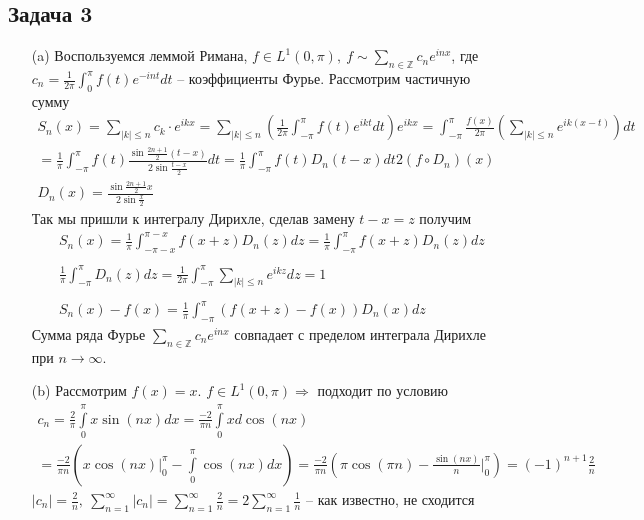 \subsection*{Задача 3}
\begin{enumerate}
\item[(a)]
	Воспользуемся леммой Римана, $f \in L^1(0,\pi),\ f \sim \sum\limits_{n \in \mathbb{Z}} c_n e^{inx}$, где $c_n = \frac{1}{2\pi} \int_{0}^{\pi} f(t) e^{-int} dt$ -- коэффициенты Фурье. Рассмотрим частичную сумму 
	\begin{gather*}
	S_n(x)
	= \sum\limits_{|k| \leqslant n} c_k \cdot e^{ikx}
	= \sum\limits_{|k| \leqslant n} \left(\frac{1}{2\pi} \int_{-\pi}^{\pi} f(t) e^{ikt} dt\right) e^{ikx}
	= \int_{-\pi}^{\pi} \frac{f(x)}{2\pi} \left(\sum\limits_{|k| \leqslant n} e^{ik(x-t)}\right)dt\\
	= \frac{1}{\pi} \int_{-\pi}^{\pi} f(t) \frac{\sin \frac{2n+1}{2}(t-x)}{2\sin \frac{t-x}{2}} dt
	= \frac{1}{\pi} \int_{-\pi}^{\pi} f(t) D_n (t-x)dt
	2(f \circ D_n)(x)\\
	D_n(x) = \frac{\sin \frac{2n+1}{2}x}{2\sin \frac{x}{2}}
	\end{gather*}
	Так мы пришли к интегралу Дирихле, сделав замену $t - x = z$ получим
	\begin{gather*}
	S_n(x)
	= \frac{1}{\pi} \int_{-\pi-x}^{\pi-x} f(x+z) D_n(z) dz
	= \frac{1}{\pi} \int_{-\pi}^{\pi} f(x+z) D_n(z) dz\\
	\\
	\frac{1}{\pi} \int_{-\pi}^{\pi} D_n(z)dz
	= \frac{1}{2\pi} \int_{-\pi}^{\pi} \sum\limits_{|k| \leqslant n} e^{ikz} dz
	= 1\\
	\\
	S_n(x) - f(x) = \frac{1}{\pi} \int_{-\pi}^{\pi}(f(x+z) - f(x)) D_n(x)dz
	\end{gather*}
	Сумма ряда Фурье $\sum\limits_{n \in \mathbb{Z}} c_n e^{inx}$ совпадает с пределом интеграла Дирихле при $n \to \infty$.
\item[(b)]
	Рассмотрим $f(x) = x$. $f \in L^1(0,\pi) \Rightarrow$ подходит по условию
	\begin{gather*}
		c_n 
		= \frac{2}{\pi} \int\limits_{0}^{\pi} x \sin(nx) dx 
		= \frac{-2}{\pi n} \int\limits_{0}^{\pi} x d \cos(nx)\\
		= \frac{-2}{\pi n} (x \cos(nx) \bigg|_{0}^{\pi} - \int\limits_{0}^{\pi} \cos(nx) dx)
		= \frac{-2}{\pi n} (\pi \cos(\pi n) - \frac{\sin(nx)}{n}\bigg|_{0}^{\pi})
		= (-1)^{n+1} \frac{2}{n}
	\end{gather*}
	$|c_n| = \frac{2}{n},\ \sum\limits_{n = 1}^{\infty}|c_n| = \sum\limits_{n=1}^{\infty} \frac{2}{n} = 2 \sum\limits_{n=1}^{\infty} \frac{1}{n}$ -- как известно, не сходится
	

\end{enumerate}
